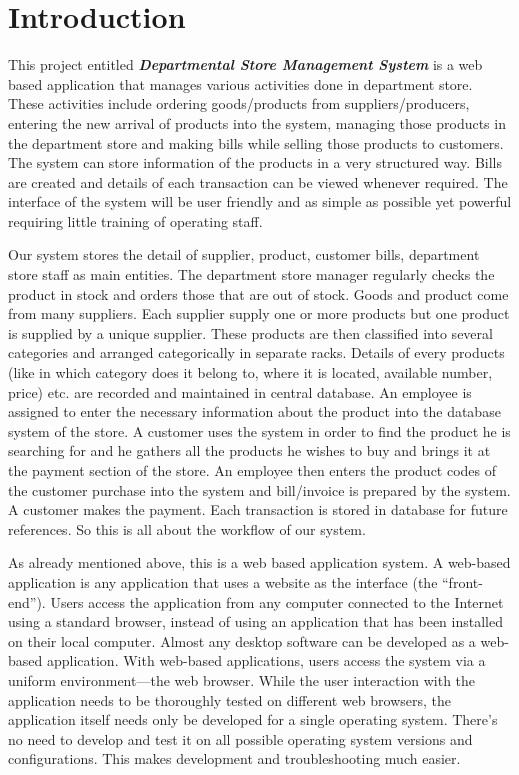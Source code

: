\section{Introduction}


This project entitled {\bf\em Departmental Store Management System} is a web based
application that manages various activities done in department store.
These activities include ordering goods/products from suppliers/producers,
entering the new arrival of products into the system, managing those products
in the department store and making bills while selling those products to customers.
The system can store information of the products in a very structured way.
Bills are created and details of each transaction can be viewed whenever required.
The interface of the system will be user friendly and as simple as possible
yet powerful requiring little training of operating staff.

Our system stores the detail of supplier, product, customer bills, department
store staff as main entities. The department store manager regularly checks the 
product in stock and orders those that are out of stock. Goods and product come 
from many suppliers. Each supplier supply one or more products but one product 
is supplied by a unique supplier. These products are then classified into several 
categories and arranged categorically in separate racks. Details of every products 
(like in which category does it belong to, where it is located, available number, 
price) etc. are recorded and maintained in central database. An employee is assigned 
to enter the necessary information about the product into the database system of 
the store. A customer uses the system in order to find the product he is searching 
for and he gathers all the products he wishes to buy and brings it at the payment 
section of the store. An employee then enters the product codes of the customer 
purchase into the system and bill/invoice is prepared by the system. A customer 
makes the payment. Each transaction is stored in database for future references. 
So this is all about the workflow of our system.

As already mentioned above, this is a web based application system. A web-based 
application is any application that uses a website as the interface
(the ``front-end''). Users access the application from any computer connected
to the Internet using a standard browser, instead of using an application 
that has been installed on their local computer. Almost any desktop software 
can be developed as a web-based application. With web-based applications, 
users access the system via a uniform environment---the web browser. While the 
user interaction with the application needs to be thoroughly tested on different 
web browsers, the application itself needs only be developed for a single
operating system. There's no need to develop and test it on all possible 
operating system versions and configurations. This makes development and 
troubleshooting much easier.
